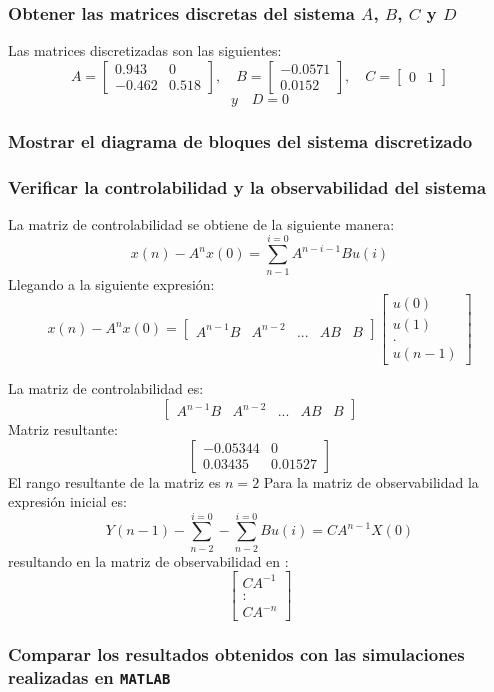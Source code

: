 \subsubsection{Obtener las matrices discretas del sistema $A$, $B$, $C$ y $D$}
Las matrices discretizadas son las siguientes:
\[
A =
\begin{bmatrix}
	0.943 & 0 \\[4pt]
	-0.462 & 0.518
\end{bmatrix}, \quad
B =
\begin{bmatrix}
	-0.0571 \\[4pt]
	0.0152
\end{bmatrix}, \quad
C =
\begin{bmatrix}
	0 & 1
\end{bmatrix}
\]
\[
y \quad
D = 0
\]

\subsubsection{Mostrar el diagrama de bloques del sistema discretizado}

\subsubsection{Verificar la controlabilidad y la observabilidad del sistema}
La matriz de controlabilidad se obtiene de la siguiente manera:
\[
	x(n)-A^{n}x(0)=\sum_{n-1}^{i=0}A^{n-i-1}Bu(i)
\]
Llegando a la siguiente expresión:
\[
	x(n)-A^{n}x(0)=
	\begin{bmatrix}
		A^{n-1}B & A^{n-2} &... & AB & B
	\end{bmatrix}
	\begin{bmatrix}
		u(0) \\
		u(1) \\
		. \\
		u(n-1)
	\end{bmatrix}
\]

La matriz de controlabilidad es:
\[
	\begin{bmatrix}
		A^{n-1}B & A^{n-2} &... & AB & B
	\end{bmatrix}
\]
Matriz resultante:
\[
\begin{bmatrix}
	-0.05344 & 0 \\
	0.03435 & 0.01527
\end{bmatrix}
\]
El rango resultante de la matriz es $n = 2$
Para la matriz de observabilidad la expresión inicial es:
\[
	Y(n-1)-\sum_{n-2}^{i = 0}-\sum_{n-2}^{i = 0}Bu(i) = CA^{n-1}X(0)
\]
resultando en la matriz de observabilidad en :
\[
\begin{bmatrix}
	CA^{-1} \\
	: \\
	CA^{-n} 
\end{bmatrix}
\]
\subsubsection{Comparar los resultados obtenidos con las simulaciones realizadas en \texttt{MATLAB}}



